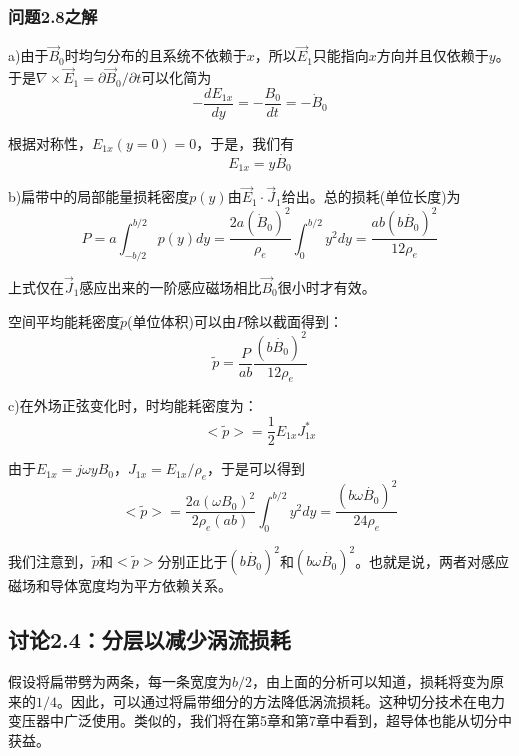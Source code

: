 \subsubsection{问题2.8之解}
a)由于$\vec{B}_0$时均匀分布的且系统不依赖于$x$，所以$\vec{E}_1$只能指向$x$方向并且仅依赖于$y$。于是$\nabla\times \vec{E}_1=\partial \vec{B}_0/\partial t$可以化简为
\begin{equation*}
-\frac{dE_{1x}}{dy}=-\frac{B_0}{dt}=-\dot{B}_0 \tag{S8.1}
\end{equation*}

根据对称性，$E_{1x}(y=0)=0$，于是，我们有
\begin{equation*}
E_{1x}=y\dot{B_0}  \tag{2.66}
\end{equation*}

b)扁带中的局部能量损耗密度$p(y)$由$\vec{E}_1\cdot\vec{J}_1$给出。总的损耗(单位长度)为
\begin{equation*}
P=a\int_{-b/2}^{b/2}p(y)dy=\frac{2a(\dot{B}_0)^2}{\rho_e}\int_{0}^{b/2}y^2dy=\frac{ab(b\dot{B_0})^2}{12\rho_e}  \tag{S8.2}
\end{equation*}

上式仅在$\vec{J}_1$感应出来的一阶感应磁场相比$\vec{B}_0$很小时才有效。

空间平均能耗密度$\tilde{p}$(单位体积)可以由$P$除以截面得到：
\begin{equation*}
\tilde{p}=\frac{P}{ab}\frac{(b\dot{B_0})^2}{12\rho_e}  \tag{2.67}
\end{equation*}

c)在外场正弦变化时，时均能耗密度为：
\begin{equation*}
<\tilde{p}>=\frac{1}{2}E_{1x} J_{1x}^*  \tag{S8.3}
\end{equation*}

由于$E_{1x}=j\omega y B_0$，$J_{1x}=E_{1x}/\rho_e$，于是可以得到
\begin{equation*}
<\tilde{p}>=\frac{2a(\omega B_0)^2}{2\rho_e (ab)}\int_{0}^{b/2} y^2 dy=\frac{(b\omega\dot{B_0})^2}{24\rho_e}  \tag{2.68}
\end{equation*}

我们注意到，$\tilde{p}$和$<\tilde{p}>$分别正比于$(b\dot{B_0})^2$和$(b\omega \dot{B_0})^2$。也就是说，两者对感应磁场和导体宽度均为平方依赖关系。




\subsection{讨论2.4：分层以减少涡流损耗}
假设将扁带劈为两条，每一条宽度为$b/2$，由上面的分析可以知道，损耗将变为原来的$1/4$。因此，可以通过将扁带细分的方法降低涡流损耗。这种切分技术在电力变压器中广泛使用。类似的，我们将在第5章和第7章中看到，超导体也能从切分中获益。



